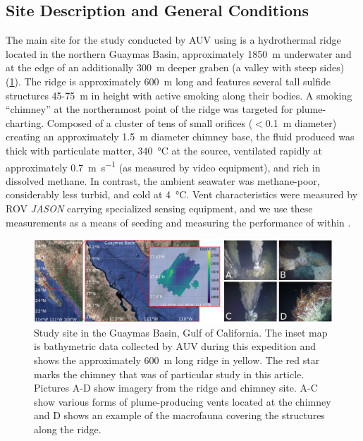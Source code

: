 \subsection{Site Description and General Conditions}
The main site for the study conducted by AUV \Sentry using \PHORTEX is a hydrothermal ridge located in the northern Guaymas Basin, approximately \SI{1850}{\meter} underwater and at the edge of an additionally \SI{300}{\meter} deeper graben (a valley with steep sides) (\cref{fig:site}). The ridge is approximately \SI{600}{\meter} long and features several tall sulfide structures 45-\SI{75}{\meter} in height with active smoking along their bodies. A smoking ``chimney'' at the northernmost point of the ridge was targeted for plume-charting. Composed of a cluster of tens of small orifices ($<$\SI{0.1}{\meter} diameter) creating an approximately \SI{1.5}{\meter} diameter chimney base, the fluid produced was thick with particulate matter, \SI{340}{\celsius} at the source, ventilated rapidly at approximately \SI{0.7}{\meter\per\second} (as measured by video equipment), and rich in dissolved methane. In contrast, the ambient seawater was methane-poor, considerably less turbid, and cold at \SI{4}{\celsius}. Vent characteristics were measured by ROV \emph{JASON} carrying specialized sensing equipment, and we use these measurements as a means of seeding and measuring the performance of \PHUMES within \PHORTEX.

\begin{figure}[h!]
    \centering
    \includegraphics[width=\columnwidth]{figures/site_summary.png}
    \caption{Study site in the Guaymas Basin, Gulf of California. The inset map is bathymetric data collected by AUV \Sentry during this expedition and shows the approximately \SI{600}{\meter} long ridge in yellow. The red star marks the chimney that was of particular study in this article. Pictures A-D show imagery from the ridge and chimney site. A-C show various forms of plume-producing vents located at the chimney and D shows an example of the macrofauna covering the structures along the ridge.}
    \label{fig:site}
\end{figure}

